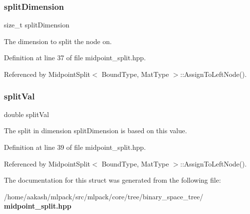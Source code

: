 \subsubsection{split\+Dimension}
{\footnotesize\ttfamily size\+\_\+t split\+Dimension}



The dimension to split the node on. 



Definition at line 37 of file midpoint\+\_\+split.\+hpp.



Referenced by Midpoint\+Split$<$ Bound\+Type, Mat\+Type $>$\+::\+Assign\+To\+Left\+Node().

\mbox{\label{structmlpack_1_1tree_1_1MidpointSplit_1_1SplitInfo_a414b35a0916562712a643bf4aa7904dd}} 
\subsubsection{split\+Val}
{\footnotesize\ttfamily double split\+Val}



The split in dimension split\+Dimension is based on this value. 



Definition at line 39 of file midpoint\+\_\+split.\+hpp.



Referenced by Midpoint\+Split$<$ Bound\+Type, Mat\+Type $>$\+::\+Assign\+To\+Left\+Node().



The documentation for this struct was generated from the following file\+:\begin{DoxyCompactItemize}
\item 
/home/aakash/mlpack/src/mlpack/core/tree/binary\+\_\+space\+\_\+tree/\textbf{ midpoint\+\_\+split.\+hpp}\end{DoxyCompactItemize}
